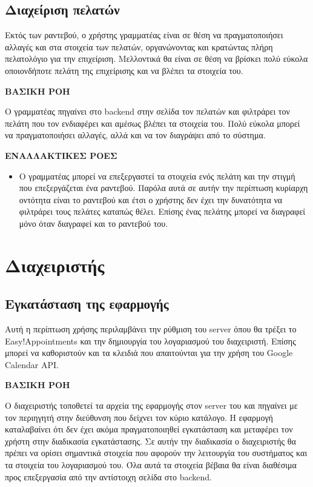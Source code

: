 \subsection{Διαχείριση πελατών}
Εκτός των ραντεβού, ο χρήστης γραμματέας είναι σε θέση να πραγματοποιήσει αλλαγές και στα στοιχεία των πελατών, οργανώνοντας και κρατώντας πλήρη πελατολόγιο για την επιχείριση. Μελλοντικά θα είναι σε θέση να βρίσκει πολύ εύκολα οποιονδήποτε πελάτη της επιχείρισης και να βλέπει τα στοιχεία του.

\textbf{ΒΑΣΙΚΗ ΡΟΗ}

Ο γραμματέας πηγαίνει στο backend στην σελίδα τον πελατών και φιλτράρει τον πελάτη που τον ενδιαφέρει και αμέσως βλέπει τα στοιχεία του. Πολύ εύκολα μπορεί να πραγματοποιήσει αλλαγές, αλλά και να τον διαγράψει από το σύστημα. 

\textbf{ΕΝΑΛΛΑΚΤΙΚΕΣ ΡΟΕΣ}

\begin{itemize}
\item Ο γραμματέας μπορεί να επεξεργαστεί τα στοιχεία ενός πελάτη και την στιγμή που επεξεργάζεται ένα ραντεβού. Παρόλα αυτά σε αυτήν την περίπτωση κυρίαρχη οντότητα είναι το ραντεβού και έτσι ο χρήστης δεν έχει την δυνατότητα να φιλτράρει τους πελάτες καταπώς θέλει. Επίσης ένας πελάτης μπορεί να διαγραφεί μόνο όταν διαγραφεί και το ραντεβού του.
\end{itemize}

\section{Διαχειριστής}
\subsection{Εγκατάσταση της εφαρμογής}
Αυτή η περίπτωση χρήσης περιλαμβάνει την ρύθμιση του server όπου θα τρέξει το Easy!Appointments και την δημιουργία του λογαριασμού του διαχειριστή. Επίσης μπορεί να καθοριστούν και τα κλειδιά που απαιτούνται για την χρήση του Google Calendar API.

\textbf{ΒΑΣΙΚΗ ΡΟΗ} 

Ο διαχειριστής τοποθετεί τα αρχεία της εφαρμογής στον server του και πηγαίνει με τον περιηγητή στην διεύθυνση που δείχνει τον κύριο κατάλογο. Η εφαρμογή καταλαβαίνει ότι δεν έχει ακόμα πραγματοποιηθεί εγκατάσταση και μεταφέρει τον χρήστη στην διαδικασία εγκατάστασης. Σε αυτήν την διαδικασία ο διαχειριστής θα πρέπει να ορίσει σημαντικά στοιχεία που αφορούν την λειτουργία του συστήματος και τα στοιχεία του λογαριασμού του. Όλα αυτά τα στοιχεία βέβαια θα είναι διαθέσιμα προς επεξεργασία από την αντίστοιχη σελίδα στο backend.

